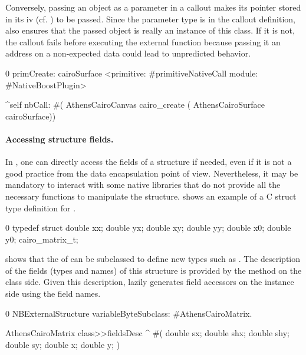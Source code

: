 Conversely, passing an  object as a parameter in a callout makes its pointer stored in its  iv (cf. ) to be passed.
Since the parameter type is  in the callout definition, \NB also ensures that the passed object is really an instance of this class.
If it is not, the callout fails before executing the external function because passing it an address on a non-expected data could lead to unpredicted behavior.

\begin{stcode}[
	label={lst:ffi-calloutOpaqueStructParameter},
	caption={Example of passing a structure by reference}]{0}
primCreate: cairoSurface
	<primitive: #primitiveNativeCall
	 module: #NativeBoostPlugin>

	^self nbCall: #(
        AthensCairoCanvas cairo_create (
                  AthensCairoSurface cairoSurface))
\end{stcode}


\paragraph{Accessing structure fields.}
In \NB, one can directly access the fields of a structure if needed, even if it is not a good practice from the data encapsulation point of view.
Nevertheless, it may be mandatory to interact with some native libraries that do not provide all the necessary functions to manipulate the structure.
 shows an example of a C struct type definition for .

\begin{ccode}[
	label={lst:ffi-cairo_c_definition},
	caption={Example external type to convert back and forth with the Cairo library}]{0}
typedef struct {
    double xx; double yx;
    double xy; double yy;
    double x0; double y0;
} cairo_matrix_t;
\end{ccode}

\noindent {} shows that the  of \NBFFI can be subclassed to define new types such as .
The description of the fields (types and names) of this structure is provided by the  method on the class side.
Given this description, \NB lazily generates field accessors on the instance side using the field names.

\begin{stcode}[
	label={lst:ffi-AthensCairoMatrix},
	caption={Example of \NBFFI definition of an \ttt{ExternalStructure}}]{0}
NBExternalStructure
    variableByteSubclass: #AthensCairoMatrix.

AthensCairoMatrix class>>fieldsDesc
	^ #(  double sx; double shx;
		  double shy; double sy;
		  double x; double y;  )
\end{stcode}


